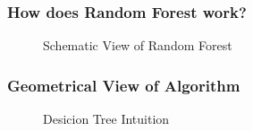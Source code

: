 \documentclass{beamer}
\begin{document}
\begin{frame}
	\frametitle{How does Random Forest work?}
    \begin{figure}
        \caption*{Schematic View of Random Forest}
    \end{figure}
    \end{frame}
\begin{frame}
	\frametitle{Geometrical View of  Algorithm}
    \begin{figure}
        \caption*{Desicion Tree Intuition}
    \end{figure}
    \end{frame}
\end{document}
